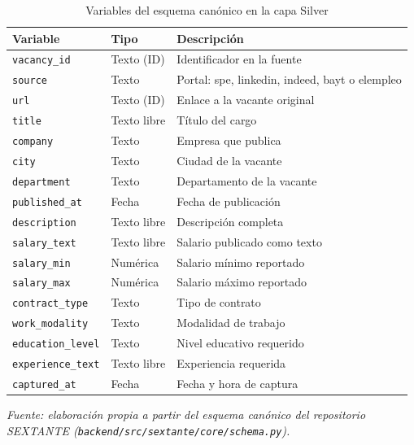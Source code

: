 \documentclass[journal]{IEEEtran}
\begin{document}
\begin{table}[H]
\caption{Variables del esquema canónico en la capa Silver}
\label{tab:vars}
\centering
\scriptsize
\renewcommand{\arraystretch}{1.15}
\begin{tabular}{p{}p{}p{}}
\hline
\textbf{Variable} & \textbf{Tipo} & \textbf{Descripción}\\
\hline
\texttt{vacancy\_id} & Texto (ID) & Identificador en la fuente\\
\texttt{source} & Texto & Portal: spe, linkedin, indeed, bayt o elempleo\\
\texttt{url} & Texto (ID) & Enlace a la vacante original\\
\texttt{title} & Texto libre & Título del cargo\\
\texttt{company} & Texto & Empresa que publica\\
\texttt{city} & Texto & Ciudad de la vacante\\
\texttt{department} & Texto & Departamento de la vacante\\
\texttt{published\_at} & Fecha & Fecha de publicación\\
\texttt{description} & Texto libre & Descripción completa\\
\texttt{salary\_text} & Texto libre & Salario publicado como texto\\
\texttt{salary\_min} & Numérica & Salario mínimo reportado\\
\texttt{salary\_max} & Numérica & Salario máximo reportado\\
\texttt{contract\_type} & Texto & Tipo de contrato\\
\texttt{work\_modality} & Texto & Modalidad de trabajo\\
\texttt{education\_level} & Texto & Nivel educativo requerido\\
\texttt{experience\_text} & Texto libre & Experiencia requerida\\
\texttt{captured\_at} & Fecha & Fecha y hora de captura\\
\hline
\end{tabular}

\vspace{2pt}
\textit{Fuente: elaboración propia a partir del esquema canónico del repositorio SEXTANTE (\texttt{backend/src/sextante/core/schema.py}).}
\end{table}
\end{document}
